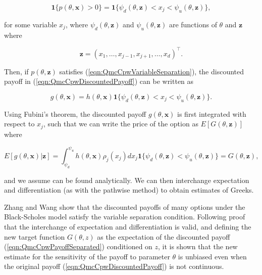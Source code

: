 \begin{equation} \label{eqn:QmcCpwVariableSeparation}
    \boldsymbol{1}\{p(\theta,\boldsymbol{x}) > 0\} = \boldsymbol{1}\{\psi_d(\theta,\boldsymbol{z}) < x_j < \psi_u(\theta,\boldsymbol{z})\},
\end{equation}

for some variable $x_j$, where $\psi_d(\theta,\boldsymbol{z})$ and $\psi_u(\theta,\boldsymbol{z})$ are functions of $\theta$ and $\boldsymbol{z}$ where

\begin{equation*}
    \boldsymbol{z} = (x_1,\dots,x_{j-1},x_{j+1},\dots,x_d)^\top.
\end{equation*}

Then, if $p(\theta,\boldsymbol{z})$ satisfies (\ref{eqn:QmcCpwVariableSeparation}), the discounted payoff in (\ref{eqn:QmcCpwDiscountedPayoff}) can be written as

\begin{equation} \label{eqn:QmcCpwPayoffSeparated}
    g(\theta,\boldsymbol{x}) = h(\theta,\boldsymbol{x})\boldsymbol{1}\{\psi_d(\theta,\boldsymbol{z}) < x_j < \psi_u(\theta,\boldsymbol{z})\}.
\end{equation}

Using Fubini's theorem, the discounted payoff $g(\theta,\boldsymbol{x})$ is first integrated with respect to $x_j$, such that we can write the price of the option as $E[G(\theta,\boldsymbol{z})]$ where 

\begin{equation} \label{eqn:QmcCpwNewTargetDefinition}
    E[g(\theta,\boldsymbol{x})|\boldsymbol{z}] = \int_{\psi_d}^{\psi_u}{h(\theta,\boldsymbol{x})\rho_j(x_j)dx_j\boldsymbol{1}\{\psi_d(\theta,\boldsymbol{z}) < \psi_u(\theta,\boldsymbol{z})\}} = G(\theta, \boldsymbol{z}),
\end{equation}

and we assume can be found analytically. We can then interchange expectation and differentiation (as with the pathwise method) to obtain estimates of Greeks.

Zhang and Wang show that the discounted payoffs of many options under the Black-Scholes model satisfy the variable separation condition. Following proof that the interchange of expectation and differentiation is valid, and defining the new target function $G(\theta,z)$ as the expectation of the discounted payoff (\ref{eqn:QmcCpwPayoffSeparated}) conditioned on $z$, it is shown that the new estimate for the sensitivity of the payoff to parameter $\theta$ is unbiased even when the original payoff (\ref{eqn:QmcCpwDiscountedPayoff}) is not continuous.

